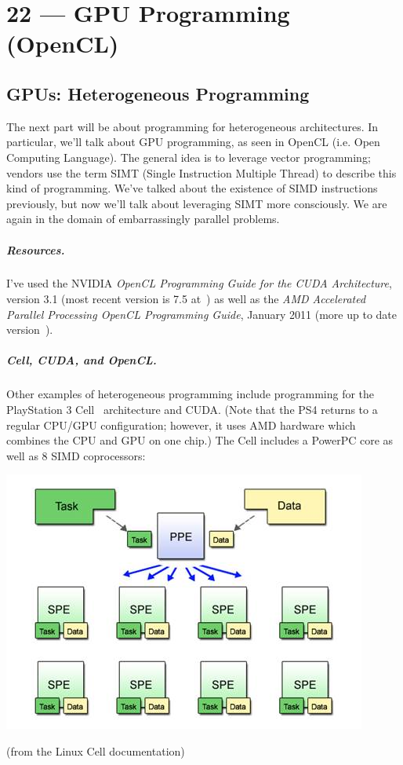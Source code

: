 \documentclass[a4paper]{report}
\begin{document}
\chapter*{22 --- GPU Programming (OpenCL)}


\section*{GPUs: Heterogeneous Programming}

The next part will be about programming for heterogeneous
architectures. In particular, we'll talk about GPU programming, as
seen in OpenCL (i.e. Open Computing Language). The general idea is to
leverage vector programming; vendors use the term SIMT (Single
Instruction Multiple Thread) to describe this kind of
programming. We've talked about the existence of SIMD instructions
previously, but now we'll talk about leveraging SIMT more
consciously. We are again in the domain of embarrassingly parallel
problems.

\paragraph{Resources.} I've used the NVIDIA \emph{OpenCL 
Programming Guide for the CUDA Architecture}, version
3.1 (most recent version is 7.5 at~\cite{cudaguide})
as well as the \emph{AMD Accelerated Parallel Processing OpenCL
  Programming Guide}, January
2011 (more up to date version~\cite{amdguide}).

\paragraph{Cell, CUDA, and OpenCL.} 
Other examples of heterogeneous programming include
programming for the PlayStation 3 Cell~\cite{cellprimer} architecture and CUDA. (Note that the PS4 returns to a regular CPU/GPU configuration; however, it uses AMD hardware which combines the CPU and GPU on one chip.) The Cell includes a PowerPC core as well as
8 SIMD coprocessors:

\begin{center}
\includegraphics[width=.4\textwidth]{images/cell.jpg}
\end{center}
\hfill (from the Linux Cell documentation)
\end{document}
